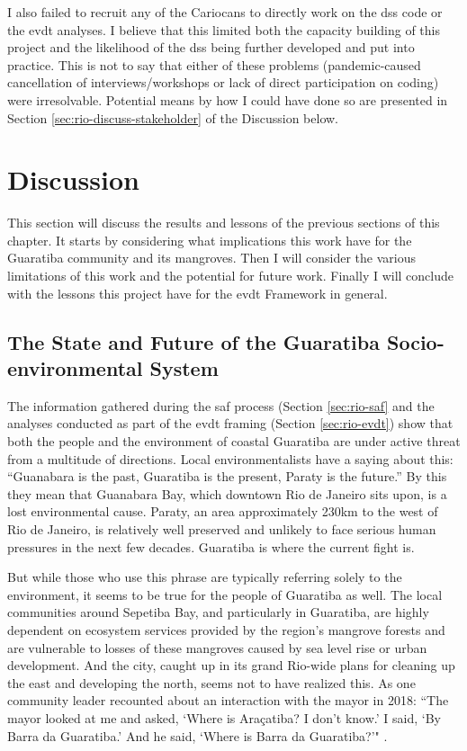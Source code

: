 I also failed to recruit any of the Cariocans to directly work on the \ac{dss} code or the \ac{evdt} analyses. I believe that this limited both the capacity building of this project and the likelihood of the \ac{dss} being further developed and put into practice. This is not to say that either of these problems (pandemic-caused cancellation of interviews/workshops or lack of direct participation on coding) were irresolvable. Potential means by how I could have done so are presented in Section \ref{sec:rio-discuss-stakeholder} of the Discussion below.

\section{Discussion} \label{sec:rio-discussion}

This section will discuss the results and lessons of the previous sections of this chapter. It starts by considering what implications this work have for the Guaratiba community and its mangroves. Then I will consider the various limitations of this work and the potential for future work. Finally I will conclude with the lessons this project have for the \ac{evdt} Framework in general.

\subsection{The State and Future of the Guaratiba Socio-environmental System} 

The information gathered during the \ac{saf} process (Section \ref{sec:rio-saf} and the analyses conducted as part of the \ac{evdt} framing (Section \ref{sec:rio-evdt}) show that both the people and the environment of coastal Guaratiba are under active threat from a multitude of directions. Local environmentalists have a saying about this: “Guanabara is the past, Guaratiba is the present, Paraty is the future.” By this they mean that Guanabara Bay, which downtown Rio de Janeiro sits upon, is a lost environmental cause. Paraty, an area approximately 230km to the west of Rio de Janeiro, is relatively well preserved and unlikely to face serious human pressures in the next few decades. Guaratiba is where the current fight is. 

But while those who use this phrase are typically referring solely to the environment, it seems to be true for the people of Guaratiba as well. The local communities around Sepetiba Bay, and particularly in Guaratiba, are highly dependent on ecosystem services provided by the region's mangrove forests and are vulnerable to losses of these mangroves caused by sea level rise or urban development.  And the city, caught up in its grand Rio-wide plans for cleaning up the east and developing the north, seems not to have realized this. As one community leader recounted about an interaction with the mayor in 2018: ``The mayor looked at me and asked, `Where is Araçatiba? I don’t know.’ I said, `By Barra da Guaratiba.’ And he said, `Where is Barra da Guaratiba?'" \cite{stroblFollowingRecentEviction2018}. 

